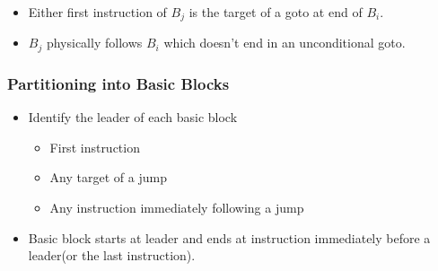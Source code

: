 \begin{itemize}
    \item Either first instruction of \(B_j\) is the target of a goto at end of \(B_i\).
    \item \(B_j\) physically follows \(B_i\) which doesn't end in an unconditional goto.
\end{itemize}










\subsubsection{Partitioning into Basic Blocks}

\begin{itemize}
\item Identify the leader of each basic block 
    \begin{itemize}
        \item First instruction
        \item Any target of a jump
        \item Any instruction immediately following a jump
    \end{itemize}

\item Basic block starts at leader and ends at instruction immediately before a leader(or the last instruction).    
\end{itemize}

